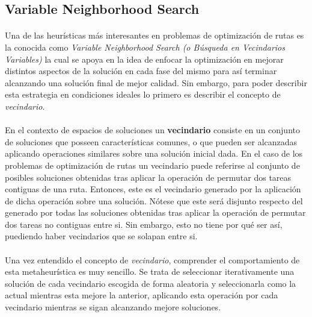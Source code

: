\documentclass{subfiles}
\begin{document}
      \subsection{Variable Neighborhood Search}
      \label{sec:solving_vns}

        \paragraph{}
        Una de las heurísticas más interesantes en problemas de optimización de rutas es la conocida como \emph{Variable Neighborhood Search (o Búsqueda en Vecindarios Variables)} la cual se apoya en la idea de enfocar la optimización en mejorar distintos aspectos de la solución en cada fase del mismo para así terminar alcanzando una solución final de mejor calidad. Sin embargo, para poder describir esta estrategia en condiciones ideales lo primero es describir el concepto de \emph{vecindario}.

        \paragraph{}
        En el contexto de espacios de soluciones un \textbf{vecindario} consiste en un conjunto de soluciones que posseen características comunes, o que pueden ser alcanzadas aplicando operaciones similares sobre una solución inicial dada. En el caso de los problemas de optimización de rutas un vecindario puede referirse al conjunto de posibles soluciones obtenidas tras aplicar la operación de permutar dos tareas contiguas de una ruta. Entonces, este es el vecindario generado por la aplicación de dicha operación sobre una solución. Nótese que este será disjunto respecto del generado por todas las soluciones obtenidas tras aplicar la operación de permutar dos tareas no contiguas entre si. Sin embargo, esto no tiene por qué ser así, puediendo haber vecindarios que se solapan entre si.

        \paragraph{}
        Una vez entendido el concepto de \emph{vecindario}, comprender el comportamiento de esta metaheurística es muy sencillo. Se trata de seleccionar iterativamente una solución de cada vecindario escogida de forma aleatoria y seleccionarla como la actual mientras esta mejore la anterior, aplicando esta operación por cada vecindario mientras se sigan alcanzando mejore soluciones.
\end{document}
